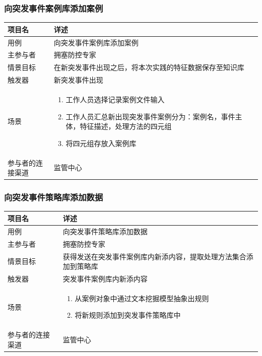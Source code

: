 \documentclass{ctexrep}
\begin{document}
\subsubsection{向突发事件案例库添加案例}
\begin{longtable}{p{2cm} | p{10cm}}
\hline
项目名 & 详述 \\
\hline
\hline
用例 & 向突发事件案例库添加案例\\
\hline
主参与者 & 拥塞防控专家\\
\hline
情景目标 & 在新突发事件出现之后，将本次实践的特征数据保存至知识库 \\
\hline
触发器 & 新突发事件出现\\
\hline
场景 & \begin{enumerate}
	\item 工作人员选择记录案例文件输入
	\item 工作人员汇总新出现突发事件案例分为：案例名，事件主体，特征描述，处理方法的四元组
	\item 将四元组存放入案例库
\end{enumerate} \\
\hline
参与者的连接渠道 & 监管中心 \\
\hline
\end{longtable}

\subsubsection{向突发事件策略库添加数据}
\begin{longtable}{p{2cm} | p{10cm}}
\hline
项目名 & 详述 \\
\hline
\hline
用例 & 向突发事件策略库添加数据\\
\hline
主参与者 & 拥塞防控专家\\
\hline
情景目标 & 获得发送在突发事件案例库内新添内容，提取处理方法集合添加到策略库 \\
\hline
触发器 & 突发事件案例库内新添内容\\
\hline
场景 & \begin{enumerate}
	\item 从案例对象中通过文本挖掘模型抽象出规则
	\item 将新规则添加到突发事件策略库中
\end{enumerate} \\
\hline
参与者的连接渠道 & 监管中心 \\
\hline
\end{longtable}
\end{document}
